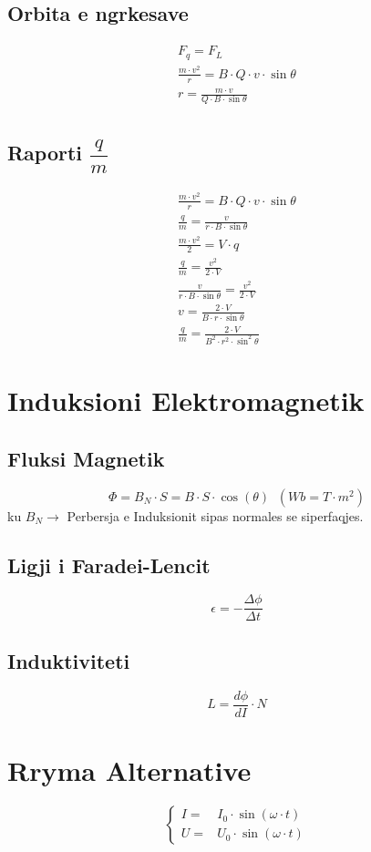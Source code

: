 \documentclass[a4paper, twocolumn]{article}
\begin{document}
\subsection{Orbita e ngrkesave}

\begin{gather*}
	F_{q}= F_{L} \\
	\frac{m\cdot v^2}{r}=B\cdot Q\cdot v\cdot \sin{\theta}\\
	r = \frac{m\cdot v}{Q\cdot B\cdot \sin{\theta}}\\
\end{gather*}

\subsection{Raporti $\dfrac{q}{m}$}
\begin{gather*}
	\frac{m\cdot v^2}{r}=B\cdot Q\cdot v\cdot \sin{\theta}\\[5pt]
	\frac{q}{m}=\frac{v}{r\cdot B\cdot \sin{\theta}}\\[10pt]
	\frac{m\cdot v^2}{2}=V\cdot q\\[5pt]
	\frac{q}{m}=\frac{v^2}{2\cdot V}\\[10pt]
	\frac{v}{r\cdot B\cdot \sin{\theta}}=\frac{v^2}{2\cdot V}\\[5pt]
	v=\frac{2\cdot V}{B\cdot r\cdot \sin{\theta}}\\[5pt]
	\frac{q}{m} = \frac{2\cdot V}{B^2 \cdot r^2 \cdot \sin^2{\theta}}
\end{gather*}
\section{Induksioni Elektromagnetik}
\subsection{Fluksi Magnetik}
\[
	\Phi = B_{N}\cdot S = B\cdot S\cdot \cos\left( \theta \right)  \;\; (Wb = T\cdot m^2)
\]
ku $B_{N} \to$ Perbersja e Induksionit sipas normales se siperfaqjes.
\subsection{Ligji i Faradei-Lencit}
\[
	\epsilon = -\frac{\Delta \phi}{\Delta t}
\]
\subsection{Induktiviteti}
\[
L = \frac{d \phi}{d I} \cdot N
\]
\section{Rryma Alternative}
\[
\left\{
	\begin{matrix}
		I =& I_0 \cdot \sin(\omega \cdot t)\\
		U =& U_0 \cdot \sin(\omega \cdot t)
	\end{matrix}
\right.
\]
\end{document}
